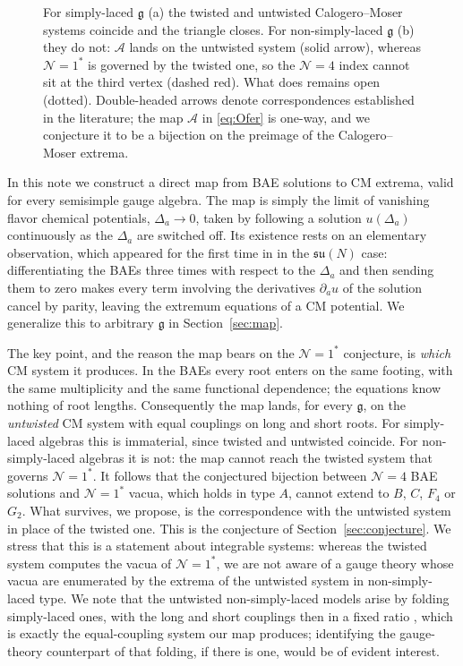 \documentclass[aps, prx, nofootinbib, twocolumn,amsfonts,amsmath,amssymb,mathtools,superscriptaddress,preprintnumbers,floatfix,reprint]{revtex4-2}
\newcommand{\alg}{\mathfrak{g}}
\begin{document}
\begin{figure}[ht!]
\caption{\justifying For simply-laced $\alg$ (a) the twisted and untwisted
Calogero--Moser systems coincide and the triangle closes. For non-simply-laced
$\alg$ (b) they do not: $\mathcal{A}$ lands on the untwisted system (solid
arrow), whereas $\mathcal{N}=1^\ast$ is governed by the twisted one, so the
$\mathcal{N}=4$ index cannot sit at the third vertex (dashed red). What does
remains open (dotted). Double-headed arrows denote correspondences established
in the literature; the map $\mathcal{A}$ in \eqref{eq:Ofer} is one-way, and we conjecture it to be a bijection on the preimage of the Calogero--Moser extrema.}
\label{fig:triangles}
\end{figure}

\medskip

In this note we construct a direct map from BAE solutions to CM extrema, valid
for every semisimple gauge algebra. The map is simply the limit of vanishing flavor chemical potentials,
$\Delta_a\to0$, taken by following a solution $u(\Delta_a)$ continuously as the
$\Delta_a$ are switched off. Its existence rests on an elementary observation, which appeared for the first time in
 \cite{aharony-mamroud} in the $\mathfrak{su}(N)$ case: differentiating the BAEs three times with respect to the $\Delta_a$ and then sending them to zero makes every term involving the derivatives
$\partial_a u$ of the solution cancel by parity, leaving the extremum equations
of a CM potential. We generalize this to arbitrary $\alg$ in
Section~\ref{sec:map}.

The key point, and the reason the map bears on the $\mathcal{N}=1^\ast$
conjecture, is \emph{which} CM system it produces. In the BAEs every root
enters on the same footing, with the same multiplicity and the same functional
dependence; the equations know nothing of root lengths. Consequently the map
lands, for every $\alg$, on the \emph{untwisted} CM system with equal couplings
on long and short roots. For simply-laced algebras this is immaterial, since
twisted and untwisted coincide. For non-simply-laced algebras it is not: the
map cannot reach the twisted system that governs $\mathcal{N}=1^\ast$. It
follows that the conjectured bijection between $\mathcal{N}=4$ BAE solutions
and $\mathcal{N}=1^\ast$ vacua, which holds in type $A$, cannot extend to
$B$, $C$, $F_4$ or $G_2$. What survives, we propose, is the correspondence with the untwisted system in
place of the twisted one. This is the conjecture of
Section~\ref{sec:conjecture}. We stress that this is a statement about
integrable systems: whereas the twisted system computes the vacua of
$\mathcal{N}=1^\ast$, we are not aware of a gauge theory whose vacua are
enumerated by the extrema of the untwisted system in non-simply-laced type. We
note that the untwisted non-simply-laced models arise by folding simply-laced
ones, with the long and short couplings then in a fixed ratio
\cite{Bordner:1998xs}, which is exactly the equal-coupling system our map
produces; identifying the gauge-theory counterpart of that folding, if there is
one, would be of evident interest.
\end{document}
